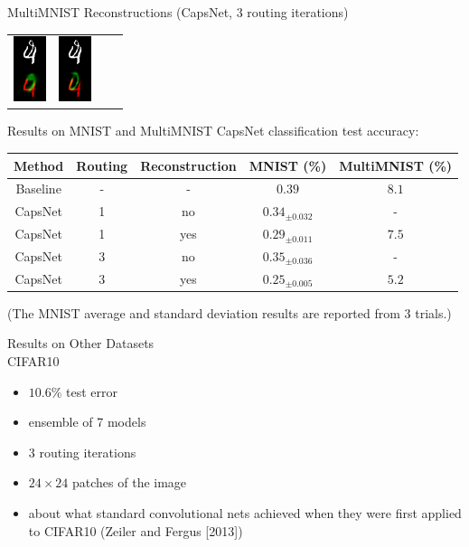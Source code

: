 \documentclass{beamer}
\begin{document}
{\begin{frame}{MultiMNIST Reconstructions (CapsNet, 3 routing iterations)}
\begin{center}
\begin{tabular}{c c c c}
          \includegraphics[height=.3\textheight]{../img/recons/4_9_4_0_453} &
          \includegraphics[height=.3\textheight]{../img/recons/4_9_4_0_454p}
        \end{tabular}
      \end{center}
    \end{frame}

    \begin{frame}{Results on MNIST and MultiMNIST}
      CapsNet classification test accuracy:
      \pause

      \begin{center}
        \begin{tabular}{c c c c c}
          \hline
          Method   & Routing & Reconstruction & MNIST (\%)                & MultiMNIST (\%) \\
          \hline
          Baseline & -       & -              & $0.39$                    & $8.1$      \\
          CapsNet  & 1       & no             & $0.34_{\pm 0.032}$        & -          \\
          CapsNet  & 1       & yes            & $0.29_{\pm 0.011}$        & $7.5$      \\
          CapsNet  & 3       & no             & $0.35_{\pm 0.036}$        & -          \\
          CapsNet  & 3       & yes            & $\bm{0.25}_{\pm 0.005}$   & $\bm{5.2}$ \\
          \hline
        \end{tabular}

        {\tiny (The MNIST average and standard deviation results are reported from $3$ trials.)}
      \end{center}
    \end{frame}

    \begin{frame}{Results on Other Datasets \\
        \tiny CIFAR10}
      \begin{itemize}[<+- | alert@+>]
        \item $10.6 \%$ test error
        \item ensemble of 7 models
        \item 3 routing iterations
        \item $24 \times 24$ patches of the image
        \item about what standard convolutional nets achieved when they were first applied to CIFAR10 (Zeiler and Fergus [2013]) %
      \end{itemize}
    \end{frame}
  }
\end{document}
